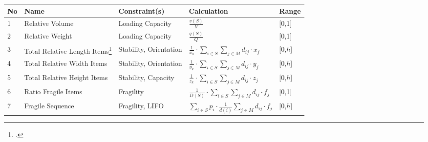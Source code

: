 \begin{table}[!ht]
    \centering
    \small
    \renewcommand{\arraystretch}{2.0}
    \begin{tabular}{@{}P{0.08\textwidth}P{0.16\textwidth}P{0.26\textwidth}P{0.28\textwidth}@{}P{0.1\textwidth}@{}}
        \toprule
        No & Name                                                                                             & Constraint(s)          & Calculation                                                                                           & Range   \\
          & Relative Volume                                                                                  & Loading Capacity       & $\displaystyle\frac{v(S)}{V}$                                                                         & [0,1]   \\
        2  & Relative Weight                                                                                  & Loading Capacity       & $\displaystyle\frac{q(S)}{Q}$                                                                         & [0,1]   \\
        3  & Total Relative Length Items\footcite[Feature is adapted from][p. 21]{sarah_de_wolf_machine_2022} & Stability, Orientation & $\displaystyle\frac{1}{x_k} \cdot \sum_{i \in S}\sum_{j \in M} d_{ij} \cdot x_j$                      & [0,$h$] \\
        4  & Total Relative Width Items \footnotemark[\value{footnote}]                                       & Stability, Orientation & $\displaystyle\frac{1}{y_k} \cdot \sum_{i \in S}\sum_{j \in M} d_{ij} \cdot y_j$                      & [0,$h$] \\
        5  & Total Relative Height Items  \footnotemark[\value{footnote}]                                     & Stability, Capacity    & $\displaystyle\frac{1}{z_k} \cdot \sum_{i \in S}\sum_{j \in M} d_{ij} \cdot z_j$                      & [0,$h$] \\
        6  & Ratio Fragile Items                                                                              & Fragility              & $\displaystyle\frac{1}{D(S)} \cdot \sum_{i \in S}\sum_{j \in M} d_{ij} \cdot f_j$                     & [0,1]   \\
        7  & Fragile Sequence                                                                                 & Fragility, \gls{LIFO}  & $\displaystyle\sum_{i \in S}p_i \cdot \frac{1}{d(i)}\sum_{j\in M} d_{ij}\cdot f_j $                   & [0,$h$] \\

\end{tabular}
\end{table}
